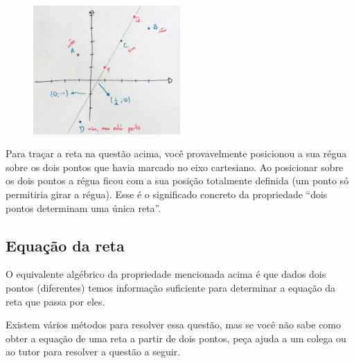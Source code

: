 \documentclass[main.tex]{subfiles}
\begin{document}

\begin{gabarito}
	\begin{gabaritoQuestao}
		\begin{figure}[h]
            \centering
            \includegraphics[width=0.5\textwidth]{./img/c6g1.jpg}
        \end{figure}
	\end{gabaritoQuestao}
\end{gabarito}


Para traçar a reta na questão acima, você provavelmente posicionou a sua régua sobre os dois pontos que havia marcado no eixo cartesiano. Ao posicionar sobre os dois pontos a régua ficou com a sua posição totalmente definida (um ponto só permitiria girar a régua). Esse é o significado concreto da propriedade ``dois pontos determinam uma única reta''.

\subsection*{Equação da reta}

O equivalente algébrico da propriedade mencionada acima é que dados dois pontos (diferentes) temos informação suficiente para determinar a equação da reta que passa por eles. 

Existem vários métodos para resolver essa questão, mas se você não sabe como obter a equação de uma reta a partir de dois pontos, peça ajuda a um colega ou ao tutor para resolver a questão a seguir.
\end{document}
